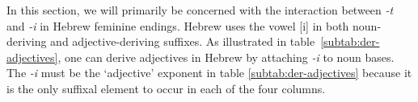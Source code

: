 In this section, we will primarily be concerned with the
interaction between \textit{-t} and \textit{-i} in Hebrew feminine endings.
Hebrew uses the vowel [i] 
in both noun-deriving and adjective-deriving suffixes. 
As illustrated in table~\ref{subtab:der-adjectives}, 
one can derive adjectives 
in Hebrew by attaching \textit{-i} to noun bases. The \textit{-i} 
must be the `adjective' exponent
in table \ref{subtab:der-adjectives} because it is the only suffixal 
element to occur in each
of the four columns. %
\begin{table}[ht]
   \centering
   \\
\vspace{6pt}
\end{table}
